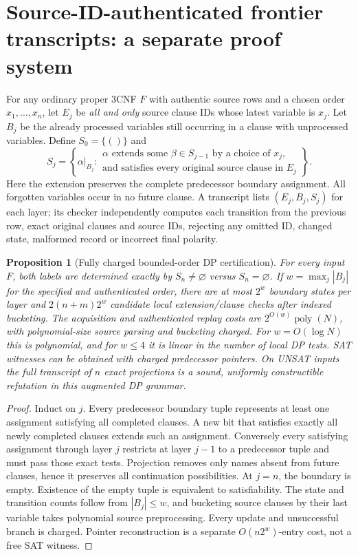 \documentclass[11pt]{article}
\newtheorem{proposition}[theorem]{Proposition}
\begin{document}
\section{Source-ID-authenticated frontier transcripts: a separate proof system}
For any ordinary proper 3CNF $F$ with authentic source rows and a chosen order $x_1,\ldots,x_n$, let $E_j$ be \emph{all and only} source clause IDs whose latest variable is $x_j$. Let $B_j$ be the already processed variables still occurring in a clause with unprocessed variables. Define $S_0=\{()\}$ and
\[
 S_j=\left\{\alpha|_{B_j}:\begin{array}{l}
 \alpha\text{ extends some }\beta\in S_{j-1}\text{ by a choice of }x_j,\\
 \text{and satisfies every original source clause in }E_j
 \end{array}\right\}.
\]
Here the extension preserves the complete predecessor boundary assignment. All forgotten variables occur in no future clause. A transcript lists $(E_j,B_j,S_j)$ for each layer; its checker independently computes each transition from the previous row, exact original clauses and source IDs, rejecting any omitted ID, changed state, malformed record or incorrect final polarity.

\begin{proposition}[Fully charged bounded-order DP certification]\label{prop:dp}
For every input $F$, both labels are determined exactly by $S_n\ne\varnothing$ versus $S_n=\varnothing$. If $w=\max_j|B_j|$ for the \emph{specified and authenticated} order, there are at most $2^w$ boundary states per layer and $2(n+m)2^w$ candidate local extension/clause checks after indexed bucketing. The acquisition and authenticated replay costs are $2^{O(w)}\operatorname{poly}(N)$, with polynomial-size source parsing and bucketing charged. For $w=O(\log N)$ this is polynomial, and for $w\le4$ it is linear in the number of local DP tests. SAT witnesses can be obtained with charged predecessor pointers. On UNSAT inputs the full transcript of $n$ exact projections is a sound, uniformly constructible refutation in \emph{this augmented DP grammar}.
\end{proposition}
\begin{proof}
Induct on $j$. Every predecessor boundary tuple represents at least one assignment satisfying all completed clauses. A new bit that satisfies exactly all newly completed clauses extends such an assignment. Conversely every satisfying assignment through layer $j$ restricts at layer $j-1$ to a predecessor tuple and must pass those exact tests. Projection removes only names absent from future clauses, hence it preserves all continuation possibilities. At $j=n$, the boundary is empty. Existence of the empty tuple is equivalent to satisfiability. The state and transition counts follow from $|B_j|\le w$, and bucketing source clauses by their last variable takes polynomial source preprocessing. Every update and unsuccessful branch is charged. Pointer reconstruction is a separate $O(n2^w)$-entry cost, not a free SAT witness.
\end{proof}
\end{document}

